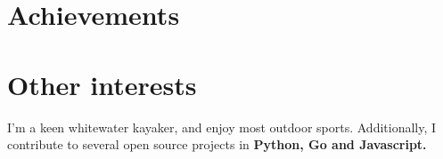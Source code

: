 \documentclass[11pt,a4paper, roman]{moderncv} %
\begin{document}
\section{Achievements}

\section{Other interests}
I'm a keen whitewater kayaker, and enjoy most outdoor sports. Additionally, I contribute to several open source projects in \textbf{Python, Go and Javascript.}





























\end{document}
